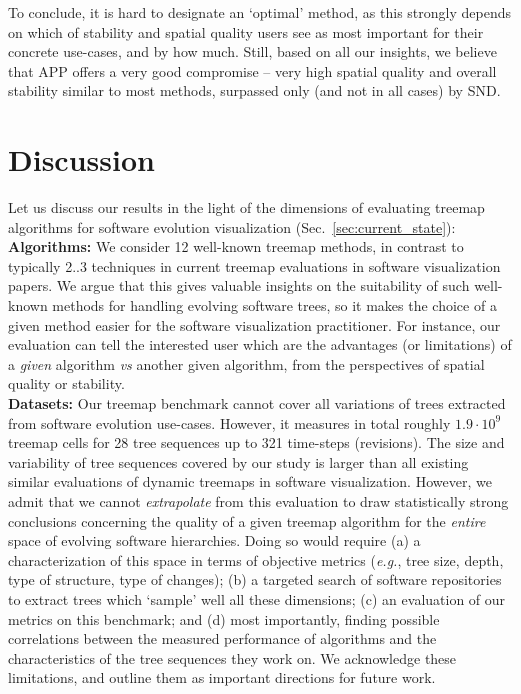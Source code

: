 To conclude, it is hard to designate an `optimal' method, as this strongly depends on which of stability and spatial quality users see as most important for their concrete use-cases, and by how much. Still, based on all our insights, we believe that APP offers a very good compromise -- very high spatial quality and overall stability similar to most methods, surpassed only (and not in all cases) by SND.


\section{Discussion}
\label{sec:init-discussion}
%
%
Let us discuss our results in the light of the dimensions of evaluating treemap algorithms for software evolution visualization (Sec.~\ref{sec:current_state}):\\

\noindent\textbf{Algorithms:} We consider 12 well-known treemap methods, in contrast to typically 2..3 techniques in current treemap evaluations in software visualization papers. We argue that this gives valuable insights on the suitability of such well-known methods for handling evolving software trees, so it makes the choice of a given method easier for the software visualization practitioner. For instance, our evaluation can tell the interested user which are the advantages (or limitations) of a \emph{given} algorithm \emph{vs} another given algorithm, from the perspectives of spatial quality or stability.\\

\noindent\textbf{Datasets:} Our treemap benchmark cannot cover all variations of trees extracted from software evolution use-cases. However, it measures in total roughly $1.9 \cdot 10^{9}$ treemap cells for 28 tree sequences up to 321 time-steps (revisions). The size and variability of tree sequences covered by our study is larger than all existing similar evaluations of dynamic treemaps in software visualization. However, we admit that we cannot \emph{extrapolate} from this evaluation to draw statistically strong conclusions concerning the quality of a given treemap algorithm for the \emph{entire} space of evolving software hierarchies. Doing so would require (a) a characterization of this space in terms of objective metrics (\emph{e.g.}, tree size, depth, type of structure, type of changes); (b) a targeted search of software repositories to extract trees which `sample' well all these dimensions; (c) an evaluation of our metrics on this benchmark; and (d) most importantly, finding possible correlations between the measured performance of algorithms and the characteristics of the tree sequences they work on. We acknowledge these limitations, and outline them as important directions for future work.\\

